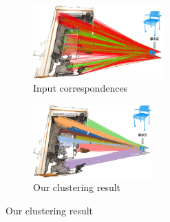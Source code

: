 \begin{figure}[ht]
        \centering
        \begin{subfigure}{0.41\textwidth}
            \centering
            \includegraphics[height=2.8cm]{images/scan2cad-cad-input-corrs.png}
              \caption{Input correspondences}
              \label{fig:scan2cad_cad-input-corrs}
          \end{subfigure}
          \begin{subfigure}{0.41\textwidth}
            \centering
            \includegraphics[height=2.8cm]{images/scan2cad-cad-cluster-corrs.png}
              \caption{Our clustering result}
              \label{fig:scan2cad_cad-cluster-corrs}
          \end{subfigure}
    

\end{figure}
